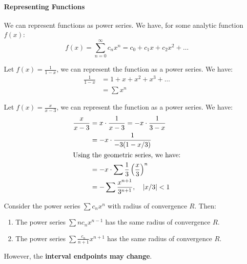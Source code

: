 \documentclass[11pt]{report}
\begin{document}
\paragraph{Representing Functions} We can represent functions as power series. We have, for some analytic function $f(x)$:
\begin{equation}
    f(x) = \sum_{n=0}^{\infty} c_n x^n = c_0 + c_1x + c_2x^2 + \ldots 
\end{equation}
\begin{example}
    Let $f(x) = \frac{1}{1-x}$, we can represent the function as a power series. We have:
    \begin{align*}
        \frac{1}{1-x} &= 1 + x + x^2 + x^3 + \ldots \\
        &= \sum x^n
    \end{align*}
\end{example}
\begin{example}
    Let $f(x) = \frac{x}{x-3}$, we can represent the function as a power series. We have:
    \begin{align*}
        \frac{x}{x-3} &= x \cdot \frac{1}{x-3} = -x \cdot \frac{1}{3-x} \\
        &= -x \cdot \frac{1}{-3(1-x/3)} \\
        \intertext{Using the geometric series, we have:}
        &= -x \cdot \sum \frac{1}{3} \left( \frac{x}{3} \right)^n \\
        &= -\sum \frac{x^{n+1}}{3^{n+1}},\quad |x/3| < 1
    \end{align*}
\end{example}
\begin{theorem}
    Consider the power series $\sum c_n x^n$ with radius of convergence $R$. Then:
    \begin{enumerate}
        \item The power series $\sum n c_n x^{n-1}$ has the same radius of convergence $R$.
        \item The power series $\sum \frac{c_n}{n+1} x^{n+1}$ has the same radius of convergence $R$.
    \end{enumerate}
    However, the \textbf{interval endpoints may change}.
\end{theorem}
\end{document}
